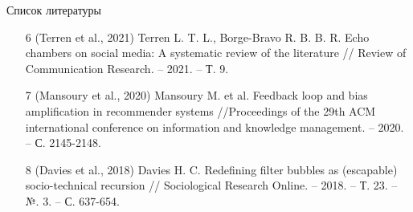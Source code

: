 \documentclass[aspectratio=169]{beamer}
\begin{document}
\begin{frame}{Список литературы}
\begin{enumerate}
            \item[6] \textcolor{myNewColorA}{(Terren et al., 2021)} Terren L. T. L., Borge-Bravo R. B. B. R. Echo chambers on social media: A systematic review of the literature // Review of Communication Research. – 2021. – Т. 9.

            \item[7] \textcolor{myNewColorA}{(Mansoury et al., 2020)} Mansoury M. et al. Feedback loop and bias amplification in recommender systems //Proceedings of the 29th ACM international conference on information and knowledge management. – 2020. – С. 2145-2148.

            \item[8] \textcolor{myNewColorA}{(Davies et al., 2018)} Davies H. C. Redefining filter bubbles as (escapable) socio-technical recursion // Sociological Research Online. – 2018. – Т. 23. – №. 3. – С. 637-654.

        \end{enumerate}
    \end{frame}
\end{document}
